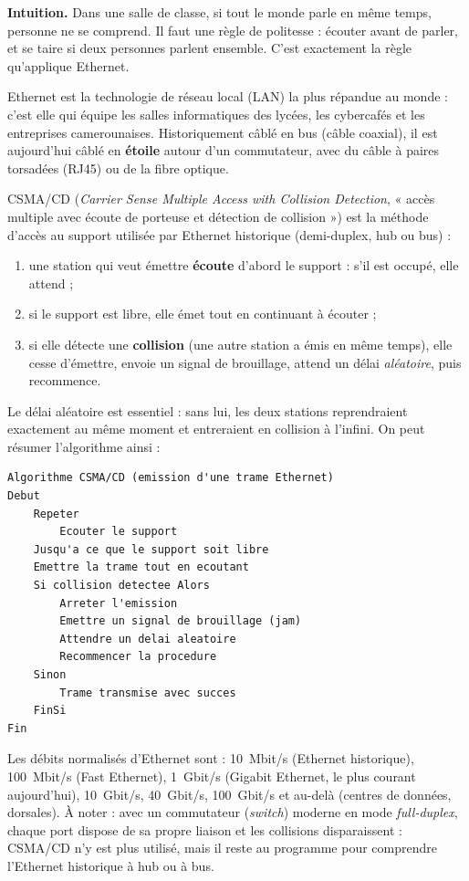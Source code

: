 \documentclass[11pt]{article}
\newcommand{\cle}[1]{{\popxbold\color{popdark}#1}}
\newcounter{popsec}
\newcounter{popsub}
\newcommand{\courssub}[1]{%
  \stepcounter{popsub}%
  \par\vspace{9pt}\noindent{\popxbold\fontsize{11.5}{13}\selectfont\color{popink}{\color{poporange}\thepopsec.\thepopsub}\hspace{6pt}#1}\par\nopagebreak\vspace{4pt}
}
\begin{document}
\courssub{Ethernet : la topologie dominante}

\textbf{Intuition.} Dans une salle de classe, si tout le monde parle en même temps, personne ne se comprend. Il faut une règle de politesse : écouter avant de parler, et se taire si deux personnes parlent ensemble. C'est exactement la règle qu'applique \cle{Ethernet}.

Ethernet est la technologie de réseau local (LAN) la plus répandue au monde : c'est elle qui équipe les salles informatiques des lycées, les cybercafés et les entreprises camerounaises. Historiquement câblé en bus (câble coaxial), il est aujourd'hui câblé en \textbf{étoile} autour d'un commutateur, avec du câble à paires torsadées (RJ45) ou de la fibre optique.

\begin{definition}[CSMA/CD]
\cle{CSMA/CD} (\emph{Carrier Sense Multiple Access with Collision Detection}, « accès multiple avec écoute de porteuse et détection de collision ») est la méthode d'accès au support utilisée par Ethernet historique (demi-duplex, hub ou bus) :
\begin{enumerate}
\item une station qui veut émettre \textbf{écoute} d'abord le support : s'il est occupé, elle attend ;
\item si le support est libre, elle émet tout en continuant à écouter ;
\item si elle détecte une \textbf{collision} (une autre station a émis en même temps), elle cesse d'émettre, envoie un signal de brouillage, attend un délai \emph{aléatoire}, puis recommence.
\end{enumerate}
\end{definition}

Le délai aléatoire est essentiel : sans lui, les deux stations reprendraient exactement au même moment et entreraient en collision à l'infini. On peut résumer l'algorithme ainsi :

\begin{lstlisting}
Algorithme CSMA/CD (emission d'une trame Ethernet)
Debut
    Repeter
        Ecouter le support
    Jusqu'a ce que le support soit libre
    Emettre la trame tout en ecoutant
    Si collision detectee Alors
        Arreter l'emission
        Emettre un signal de brouillage (jam)
        Attendre un delai aleatoire
        Recommencer la procedure
    Sinon
        Trame transmise avec succes
    FinSi
Fin
\end{lstlisting}

\begin{propriete}
Les débits normalisés d'Ethernet sont : \SI{10}{Mbit/s} (Ethernet historique), \SI{100}{Mbit/s} (Fast Ethernet), \SI{1}{Gbit/s} (Gigabit Ethernet, le plus courant aujourd'hui), \SI{10}{Gbit/s}, \SI{40}{Gbit/s}, \SI{100}{Gbit/s} et au-delà (centres de données, dorsales). À noter : avec un commutateur (\emph{switch}) moderne en mode \emph{full-duplex}, chaque port dispose de sa propre liaison et les collisions disparaissent : CSMA/CD n'y est plus utilisé, mais il reste au programme pour comprendre l'Ethernet historique à hub ou à bus.
\end{propriete}
\end{document}

